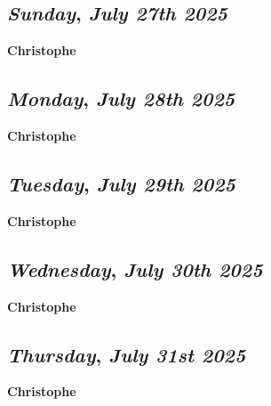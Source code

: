 \def\day{\textit{July 27th 2025}}
\def\weekday{\textit{Sunday}}
\subsection*{\weekday, \day}
\textbf {Christophe}

\def\day{\textit{July 28th 2025}}
\def\weekday{\textit{Monday}}
\subsection*{\weekday, \day}
\textbf {Christophe}

\def\day{\textit{July 29th 2025}}
\def\weekday{\textit{Tuesday}}
\subsection*{\weekday, \day}
\textbf {Christophe}

\def\day{\textit{July 30th 2025}}
\def\weekday{\textit{Wednesday}}
\subsection*{\weekday, \day}
\textbf {Christophe}

\def\day{\textit{July 31st 2025}}
\def\weekday{\textit{Thursday}}
\subsection*{\weekday, \day}
\textbf {Christophe}
